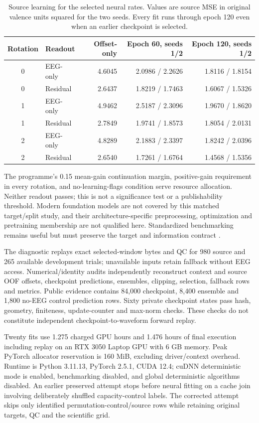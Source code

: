 \documentclass[11pt,a4paper]{article}
\begin{document}
\begin{table}[htbp]
\centering
\caption{Source learning for the selected neural rates. Values are source MSE in original valence units squared for the two seeds. Every fit runs through epoch 120 even when an earlier checkpoint is selected.}
\label{tab:learning}
\small
\begin{tabular}{@{}clrrr@{}}
\toprule
Rotation & Readout & Offset-only & Epoch 60, seeds 1/2 & Epoch 120, seeds 1/2\\
\midrule
0 & EEG-only & 4.6045 & 2.0986 / 2.2626 & 1.8116 / 1.8154\\
0 & Residual & 2.6437 & 1.8219 / 1.7463 & 1.6067 / 1.5326\\
1 & EEG-only & 4.9462 & 2.5187 / 2.3096 & 1.9670 / 1.8620\\
1 & Residual & 2.7849 & 1.9741 / 1.8573 & 1.8054 / 2.0131\\
2 & EEG-only & 4.8289 & 2.1883 / 2.3397 & 1.8242 / 2.0396\\
2 & Residual & 2.6540 & 1.7261 / 1.6764 & 1.4568 / 1.5356\\
\bottomrule
\end{tabular}
\end{table}

The programme's 0.15 mean-gain continuation margin, positive-gain requirement in every rotation, and no-learning-flags condition serve resource allocation. Neither readout passes; this is not a significance test or a publishability threshold. Modern foundation models are not covered by this matched target/split study, and their architecture-specific preprocessing, optimization and pretraining membership are not qualified here. Standardized benchmarking remains useful but must preserve the target and information contract \cite{liu2025libeer}.

The diagnostic replays exact selected-window bytes and QC for 980 source and 265 available development trials; unavailable inputs retain fallback without EEG access. Numerical/identity audits independently reconstruct context and source OOF offsets, checkpoint predictions, ensembles, clipping, selection, fallback rows and metrics. Public evidence contains 84,000 checkpoint, 8,400 ensemble and 1,800 no-EEG control prediction rows. Sixty private checkpoint states pass hash, geometry, finiteness, update-counter and max-norm checks. These checks do not constitute independent checkpoint-to-waveform forward replay.

Twenty fits use 1.275 charged GPU hours and 1.476 hours of final execution including replay on an RTX 3050 Laptop GPU with 6 GB memory. Peak PyTorch allocator reservation is 160 MiB, excluding driver/context overhead. Runtime is Python 3.11.13, PyTorch 2.5.1, CUDA 12.4; cuDNN deterministic mode is enabled, benchmarking disabled, and global deterministic algorithms disabled. An earlier preserved attempt stops before neural fitting on a cache join involving deliberately shuffled capacity-control labels. The corrected attempt skips only identified permutation-control/source rows while retaining original targets, QC and the scientific grid.
\end{document}
